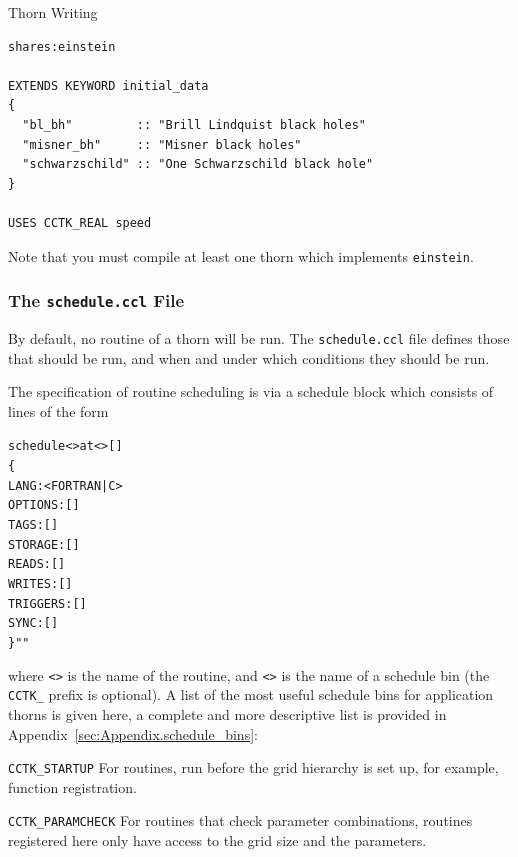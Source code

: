 \begin{cactuspart}{Thorn Writing}
\begin{verbatim}
shares:einstein

EXTENDS KEYWORD initial_data
{
  "bl_bh"         :: "Brill Lindquist black holes"
  "misner_bh"     :: "Misner black holes"
  "schwarzschild" :: "One Schwarzschild black hole"
}

USES CCTK_REAL speed

\end{verbatim}

Note that you must compile at least one thorn which implements \texttt{einstein}.



\subsubsection{The \texttt{schedule.ccl} File}
\label{subsec:schedule_ccl}
By default, no routine of a thorn will be run.  The \texttt{schedule.ccl}
file defines those that should be run, and when and under which
conditions they should be run.

The specification of routine scheduling is via a schedule block which
consists of lines of the form

\begin{alltt}
schedule <> at <> []
\{
  LANG:     <FORTRAN|C>
  OPTIONS:  []
  TAGS:     []
  STORAGE:  []
  READS:    []
  WRITES:   []
  TRIGGERS: []
  SYNC:     []
\} ""
\end{alltt}
where \texttt{<>} is the name of the routine, and
\texttt{<>} is the name of a schedule bin (the \texttt{CCTK\_}
prefix is optional). A list of the most useful schedule bins for application
thorns is given here, a complete and more descriptive list is provided in
Appendix~\ref{sec:Appendix.schedule_bins}:

\begin{Lentry}

\item [\texttt{CCTK\_STARTUP}]
For routines, run before the grid hierarchy is set up, for example, function
registration.

\item [\texttt{CCTK\_PARAMCHECK}]
For routines that check parameter combinations, routines registered here
only have access to the grid size and the parameters.


\end{Lentry}
\end{cactuspart}
